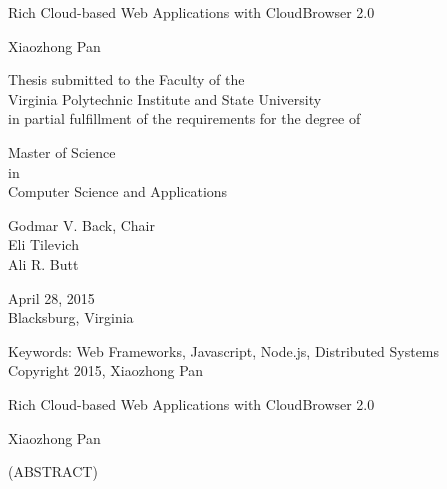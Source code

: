\documentclass[12pt]{report}
\begin{document}
\newcommand{\cb}{Cloud\-Browser\xspace}
\newcommand{\projectname}{Cloud\-Browser\xspace}
\newcommand{\cbtwo}{Cloud\-Browser 2.0\xspace}
\newcommand{\js}{Java\-Script\xspace}
\newcommand{\nodejs}{Node.js\xspace}
\newcommand{\appins}{App Instance\xspace}
\newcommand{\citemain}{~\cite{mcdaniel2012cloudbrowser}}
\newcommand{\etdtitle}{Rich Cloud-based Web Applications with \cbtwo}

\newcommand{\longcaption}[2]{\caption[#1]{#1 #2}}



\def\code#1{\texttt{#1}}
\def\nodermi{\texttt{nodermi\xspace}}

\thispagestyle{empty}
\begin{center}

{\Large 
\etdtitle{}
}

\vfill

Xiaozhong Pan

\vfill

Thesis submitted to the Faculty of the \\
Virginia Polytechnic Institute and State University \\
in partial fulfillment of the requirements for the degree of

\vfill

Master of Science \\
in \\
Computer Science and Applications

\vfill

Godmar V. Back, Chair \\
Eli Tilevich\\
Ali R. Butt

\vfill

April 28, 2015 \\
Blacksburg, Virginia

\vfill

Keywords: Web Frameworks, Javascript, Node.js, Distributed Systems
\\
Copyright 2015, Xiaozhong Pan

\end{center}

\pagebreak

\thispagestyle{empty}
\begin{center}

{\large \etdtitle{}}

\vfill

Xiaozhong Pan

\vfill

(ABSTRACT)

\vfill

\end{center}
\end{document}
